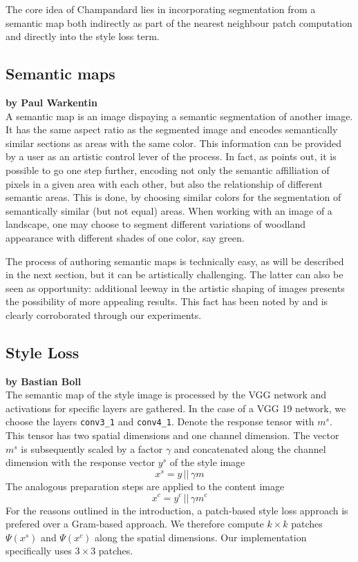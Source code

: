 The core idea of Champandard lies in incorporating segmentation from a semantic map both indirectly as part of the nearest neighbour patch computation and directly into the style loss term.

\subsection{Semantic maps}

\textbf{by Paul Warkentin} \\

A semantic map is an image dispaying a semantic segmentation of another image. It has the same aspect ratio as the segmented image and encodes semantically similar sections as areas with the same color. This information can be provided by a user as an artistic control lever of the process. In fact, as \cite{doodles2016} points out, it is possible to go one step further, encoding not only the semantic affilliation of pixels in a given area with each other, but also the relationship of different semantic areas. This is done, by choosing similar colors for the segmentation of semantically similar (but not equal) areas. When working with an image of a landscape, one may choose to segment different variations of woodland appearance with different shades of one color, say green.

The process of authoring semantic maps is technically easy, as will be described in the next section, but it can be artistically challenging. The latter can also be seen as opportunity: additional leeway in the artistic shaping of images presents the possibility of more appealing results. This fact has been noted by \cite{doodles2016} and is clearly corroborated through our experiments.

\clearpage
\subsection{Style Loss}

\textbf{by Bastian Boll} \\

The semantic map of the style image is processed by the VGG network and activations for specific layers are gathered. In the case of a VGG 19 network, we choose the layers \texttt{conv3\_1} and \texttt{conv4\_1}. Denote the response tensor with \(m^s\). This tensor has two spatial dimensions and one channel dimension. The vector \(m^s\) is subsequently scaled by a factor \(\gamma\) and concatenated along the channel dimension with the response vector \(y^s\) of the style image
\[x^s = y \,||\,\gamma m \]
The analogous preparation steps are applied to the content image
\[x^c = y^c \,||\,\gamma m^c \]
For the reasons outlined in the introduction, a patch-based style loss approach is prefered over a Gram-based approach. We therefore compute \(k\times k\) patches \(\Psi (x^s)\) and \(\Psi (x^c)\) along the spatial dimensions. Our implementation specifically uses \(3\times 3\) patches. 

